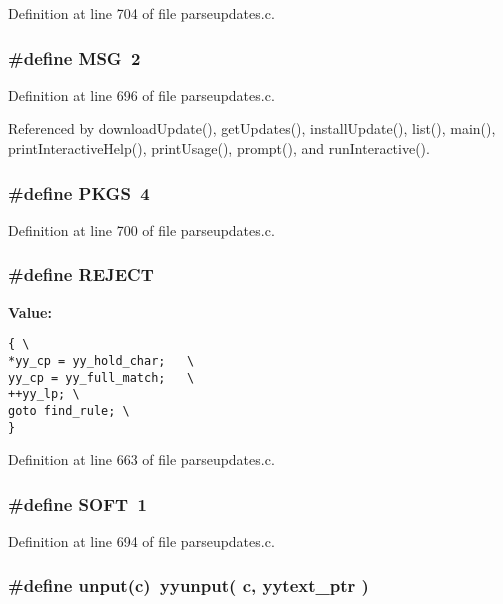 Definition at line 704 of file parseupdates.c.
\subsubsection{\setlength{\rightskip}{0pt plus 5cm}\#define MSG\ 2}\label{parseupdates_8c_a41}




Definition at line 696 of file parseupdates.c.

Referenced by download\-Update(), get\-Updates(), install\-Update(), list(), main(), print\-Interactive\-Help(), print\-Usage(), prompt(), and run\-Interactive().
\subsubsection{\setlength{\rightskip}{0pt plus 5cm}\#define PKGS\ 4}\label{parseupdates_8c_a43}




Definition at line 700 of file parseupdates.c.
\subsubsection{\setlength{\rightskip}{0pt plus 5cm}\#define REJECT}\label{parseupdates_8c_a35}


{\bf Value:}

\footnotesize\begin{verbatim}{ \
*yy_cp = yy_hold_char;   \
yy_cp = yy_full_match;   \
++yy_lp; \
goto find_rule; \
}
\end{verbatim}\normalsize 


Definition at line 663 of file parseupdates.c.
\subsubsection{\setlength{\rightskip}{0pt plus 5cm}\#define SOFT\ 1}\label{parseupdates_8c_a40}




Definition at line 694 of file parseupdates.c.
\subsubsection{\setlength{\rightskip}{0pt plus 5cm}\#define unput(c)\ yyunput( c, yytext\_\-ptr )}\label{parseupdates_8c_a18}





